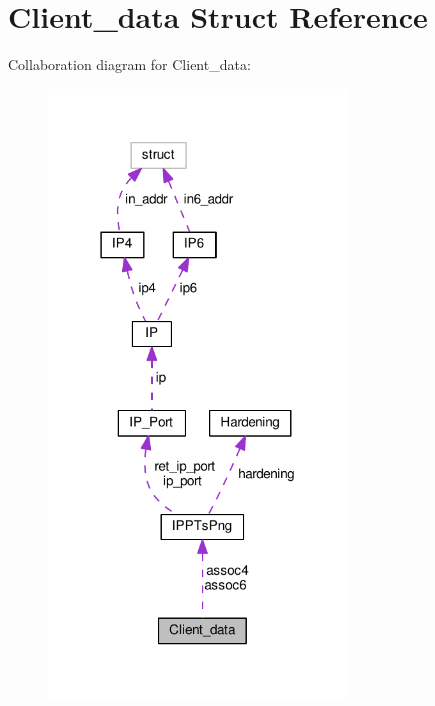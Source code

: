 \hypertarget{struct_client__data}{\section{Client\+\_\+data Struct Reference}
\label{struct_client__data}
}


Collaboration diagram for Client\+\_\+data\+:
\nopagebreak
\begin{figure}[H]
\begin{center}
\leavevmode
\includegraphics[width=226pt]{struct_client__data__coll__graph}
\end{center}
\end{figure}
